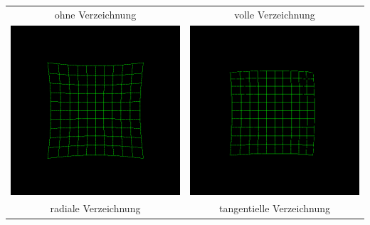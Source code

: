 \documentclass{beamer}
\begin{document}
\begin{frame}
\begin{center}
\begin{table}[]
\begin{tabular}{cc}
        ohne Verzeichnung & volle Verzeichnung \\
        \includegraphics[trim={55 55 55 55},clip,scale=0.35]{distortionradial}  & \includegraphics[trim={55 55 55 55},clip,scale=0.35]{distortiontangetial}  \\
        radiale Verzeichnung & tangentielle Verzeichnung
      \end{tabular}
    \end{table}
  \end{center}

\end{frame}
\end{document}
